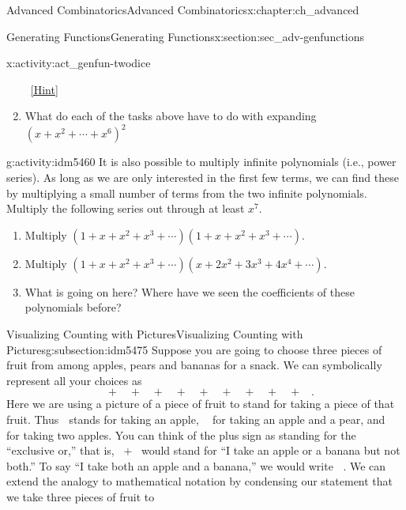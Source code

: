 \documentclass[oneside,10pt,]{book}
\numberwithin{equation}{chapter}
\newcommand{\apple}{\text{🍎}}
\newcommand{\ap}{\apple}
\newcommand{\banana}{\text{🍌}}
\newcommand{\ba}{\banana}
\newcommand{\pear}{\text{🍐}}
\newcommand{\pe}{\pear}
\begin{document}
\begin{chapterptx}{Advanced Combinatorics}{}{Advanced Combinatorics}{}{}{x:chapter:ch_advanced}
\begin{sectionptx}{Generating Functions}{}{Generating Functions}{}{}{x:section:sec_adv-genfunctions}
\begin{introduction}{}
\begin{activity}{}{x:activity:act_genfun-twodice}
\begin{enumerate}[font=\bfseries,label=(\alph*),ref=\alph*]
\qquad~\hfill{\tiny\hyperlink{g:hint:idm5453-back}{[Hint]}}\item{}What do each of the tasks above have to do with expanding \((x+x^2 + \cdots +x^6)^2\)%
\end{enumerate}
\end{activity}
\begin{activity}{}{g:activity:idm5460}%
It is also possible to multiply infinite polynomials (i.e., power series).  As long as we are only interested in the first few terms, we can find these by multiplying a small number of terms from the two infinite polynomials.  Multiply the following series out through at least \(x^7\).%
\begin{enumerate}[font=\bfseries,label=(\alph*),ref=\alph*]
\item{}Multiply \((1+x+x^2+x^3 + \cdots)(1+ x + x^2 + x^3+ \cdots)\).%
\item{}Multiply \((1+x+x^2 + x^3 + \cdots)(x + 2x^2 + 3x^3 + 4x^4 + \cdots)\).%
\item{}What is going on here?  Where have we seen the coefficients of these polynomials before?%
\end{enumerate}
\end{activity}
\end{introduction}%
%
%
\typeout{************************************************}
\typeout{************************************************}
%
\begin{subsectionptx}{Visualizing Counting with Pictures}{}{Visualizing Counting with Pictures}{}{}{g:subsection:idm5475}
Suppose you are going to choose three pieces of fruit from among apples, pears and bananas for a snack.  We can symbolically represent all your choices as%
\begin{equation*}
\ap\ap\ap+\pe\pe\pe+\ba\ba\ba+\ap\ap\pe+\ap\ap\ba+\ap\pe\pe +\pe\pe\ba
+\ap\ba\ba+\pe\ba\ba+\ap\pe\ba.
\end{equation*}
Here we are using a picture of a piece of fruit to stand for taking a piece of that fruit. Thus \(\ap\) stands for taking an apple, \(\ap\pe\) for taking an apple and a pear, and \(\ap\ap\) for taking two apples.  You can think of the plus sign as standing for the ``exclusive or,'' that is, \(\ap+\ba\) would stand for ``I take an apple or a banana but not both.'' To say ``I take both an apple and a banana,'' we would write \(\ap\ba\). We can extend the analogy to mathematical notation by condensing our statement that we take three pieces of fruit to%
\begin{equation*}

\end{equation*}
\end{subsectionptx}
\end{sectionptx}
\end{chapterptx}
\end{document}
